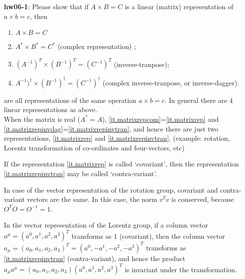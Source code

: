 \documentclass[12pt]{article}
\begin{document}
{\bf hw06-1}:  Please show that if $A \times B = C$ is a linear (matrix) representation of $a\times b = c$, then
\begin{enumerate}
    \item $A \times B = C$ \label{it.matrixrep}
    \item $A^* \times B^* = C^*$ (complex representation) \label{it.matrixrepcom};
    \item $(A^{-1})^T \times (B^{-1})^T = (C^{-1})^T$ (inverse-tranpose)\label{it.matrixrepinvtran};
    \item $A^{-1})^\dagger \times (B^{-1})^\dagger = (C^{-1})^\dagger$
    (complex inverse-tranpose, or inverse-dagger). \label{it.matrixrepinvdag}
\end{enumerate}
   are all representations of the same operation $a\times b = c$.
  In general there are 4 linear representations as above.\\


  When the matrix is real ($A^* = A$), \ref{it.matrixrepcom}=\ref{it.matrixrep} and \ref{it.matrixrepinvdag}=\ref{it.matrixrepinvtran}, and
  hence there are just two representations, \ref{it.matrixrep} and \ref{it.matrixrepinvtran}.
  (example: rotation, Lorentz transformation of co-ordinates
  and four-vectors, etc)

  If the representation \ref{it.matrixrep} is called `covariant', then
  the representation \ref{it.matrixrepinvtran} may be called `contra-variant'.

  In case of the vector representation of the rotation
  group, covariant and contra-variant vectors are the
  same.  In this case, the norm
  $v^T v$
  is conserved, because $O^T O = O^{-1} = 1$.

  In the vector representation of the Lorentz group, if
  a column vector $a^\mu = (a^0, a^1, a^2, a^3)^T$
  transforms as 1 (covariant), then the column vector
  $a_\mu = (a_0, a_1, a_2, a_3)^T = (a^0, -a^1, -a^2, -a^3)^T$
  transforms as \ref{it.matrixrepinvtran} (contra-variant), and hence the product
  $a_\mu a^\mu = (a_0, a_1, a_2, a_3)(a^0, a^1, a^2, a^3)^T$
  is invariant under the transformation.
\end{document}
